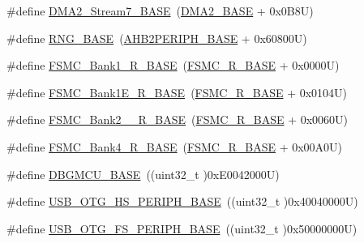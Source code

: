 \begin{DoxyCompactItemize}
\item 
\#define \hyperlink{group___peripheral__registers__structures_gaa9faa708ad2440d24eb1064cba9bb06d}{D\+M\+A2\+\_\+\+Stream7\+\_\+\+B\+A\+SE}~(\hyperlink{group___peripheral__memory__map_gab72a9ae145053ee13d1d491fb5c1df64}{D\+M\+A2\+\_\+\+B\+A\+SE} + 0x0\+B8\+U)
\item 
\#define \hyperlink{group___peripheral__registers__structures_gab92662976cfe62457141e5b4f83d541c}{R\+N\+G\+\_\+\+B\+A\+SE}~(\hyperlink{group___peripheral__memory__map_gaeedaa71d22a1948492365e2cd26cfd46}{A\+H\+B2\+P\+E\+R\+I\+P\+H\+\_\+\+B\+A\+SE} + 0x60800\+U)
\item 
\#define \hyperlink{group___peripheral__registers__structures_gad196fe6f5e4041b201d14f43508c06d2}{F\+S\+M\+C\+\_\+\+Bank1\+\_\+\+R\+\_\+\+B\+A\+SE}~(\hyperlink{group___peripheral__registers__structures_gaddf0e199dccba83272b20c9fb4d3aaed}{F\+S\+M\+C\+\_\+\+R\+\_\+\+B\+A\+SE} + 0x0000\+U)
\item 
\#define \hyperlink{group___peripheral__registers__structures_gaea182589c84aee30b7f735474d8774e2}{F\+S\+M\+C\+\_\+\+Bank1\+E\+\_\+\+R\+\_\+\+B\+A\+SE}~(\hyperlink{group___peripheral__registers__structures_gaddf0e199dccba83272b20c9fb4d3aaed}{F\+S\+M\+C\+\_\+\+R\+\_\+\+B\+A\+SE} + 0x0104\+U)
\item 
\#define \hyperlink{group___peripheral__registers__structures_ga851707a200f63e03c336073706fdce1d}{F\+S\+M\+C\+\_\+\+Bank2\+\_\+\_\+\+R\+\_\+\+B\+A\+SE}~(\hyperlink{group___peripheral__registers__structures_gaddf0e199dccba83272b20c9fb4d3aaed}{F\+S\+M\+C\+\_\+\+R\+\_\+\+B\+A\+SE} + 0x0060\+U)
\item 
\#define \hyperlink{group___peripheral__registers__structures_gaf9e5417133160b0bdd0498d982acec19}{F\+S\+M\+C\+\_\+\+Bank4\+\_\+\+R\+\_\+\+B\+A\+SE}~(\hyperlink{group___peripheral__registers__structures_gaddf0e199dccba83272b20c9fb4d3aaed}{F\+S\+M\+C\+\_\+\+R\+\_\+\+B\+A\+SE} + 0x00\+A0\+U)
\item 
\#define \hyperlink{group___peripheral__registers__structures_ga4adaf4fd82ccc3a538f1f27a70cdbbef}{D\+B\+G\+M\+C\+U\+\_\+\+B\+A\+SE}~((uint32\+\_\+t )0x\+E0042000\+U)
\item 
\#define \hyperlink{group___peripheral__registers__structures_gaa405d2ebfd7e9394237b6639f16a5409}{U\+S\+B\+\_\+\+O\+T\+G\+\_\+\+H\+S\+\_\+\+P\+E\+R\+I\+P\+H\+\_\+\+B\+A\+SE}~((uint32\+\_\+t )0x40040000\+U)
\item 
\#define \hyperlink{group___peripheral__registers__structures_gaa86d4c80849a74938924e73937b904e7}{U\+S\+B\+\_\+\+O\+T\+G\+\_\+\+F\+S\+\_\+\+P\+E\+R\+I\+P\+H\+\_\+\+B\+A\+SE}~((uint32\+\_\+t )0x50000000\+U)

\end{DoxyCompactItemize}

